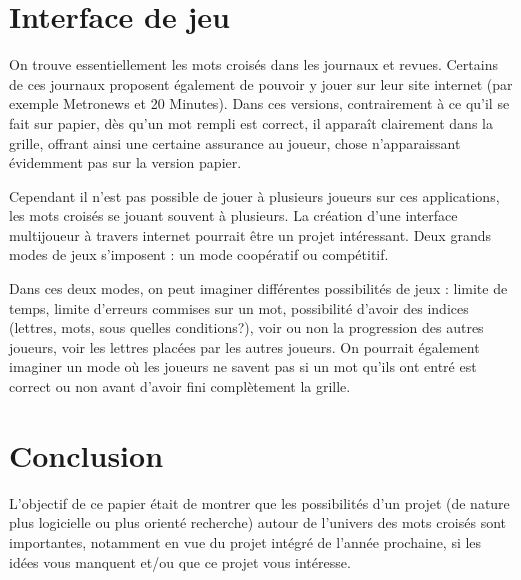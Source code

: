 \documentclass{article}
\begin{document}
\section{Interface de jeu}

On trouve essentiellement les mots croisés dans les journaux et revues. Certains de ces journaux proposent également de pouvoir y jouer sur leur site internet (par exemple Metronews et 20 Minutes). Dans ces versions, contrairement à ce qu'il se fait sur papier, dès qu'un mot rempli est correct, il apparaît clairement dans la grille, offrant ainsi une certaine assurance au joueur, chose n'apparaissant évidemment pas sur la version papier.

Cependant il n'est pas possible de jouer à plusieurs joueurs sur ces applications, les mots croisés se jouant souvent à plusieurs. La création d'une interface multijoueur à travers internet pourrait être un projet intéressant. Deux grands modes de jeux s'imposent : un mode coopératif ou compétitif.

Dans ces deux modes, on peut imaginer différentes possibilités de jeux : limite de temps, limite d'erreurs commises sur un mot, possibilité d'avoir des indices (lettres, mots, sous quelles conditions?), voir ou non la progression des autres joueurs, voir les lettres placées par les autres joueurs. On pourrait également imaginer un mode où les joueurs ne savent pas si un mot qu'ils ont entré est correct ou non avant d'avoir fini complètement la grille.

\section{Conclusion}

L'objectif de ce papier était de montrer que les possibilités d'un projet (de nature plus logicielle ou plus orienté recherche) autour de l'univers des mots croisés sont importantes, notamment en vue du projet intégré de l'année prochaine, si les idées vous manquent et/ou que ce projet vous intéresse.



\end{document}
